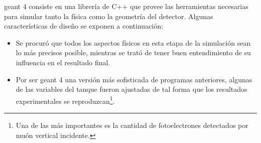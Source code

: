 		{\sc geant 4} consiste en una librer\'ia de C++ que provee las herramientas necesarias para simular tanto la f\'isica como la geometr\'ia del detector.
		Algunas caracter\'isticas de dise\~no se exponen a continuaci\'on:
		\begin{itemize}
		\item Se procur\'o que todos los aspectos f\'isicos en esta etapa de la simulaci\'on sean lo m\'as precisos posible, mientras se trat\'o de tener buen entendimiento de su influencia en el resultado final.
		\item Por ser {\sc geant 4} una versi\'on m\'as sofisticada de programas anteriores, algunas de las variables del tanque fueron ajustadas de tal forma que los resultados experimentales se reproduzcan\footnote{Una de las m\'as importantes es la cantidad de fotoelectrones detectados por mu\'on vertical incidente.}.
		\end{itemize}
		
